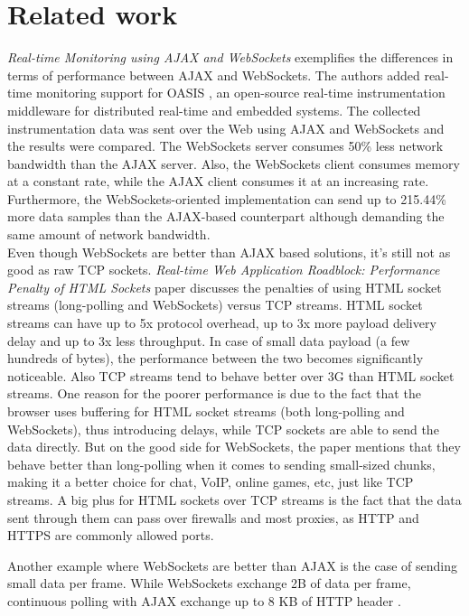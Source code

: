 \documentclass[conference]{IEEEtran}
\begin{document}
\section{Related work}
\textit{Real-time Monitoring using AJAX and WebSockets} \cite{RT-Monitoring}
exemplifies the differences in terms of performance between AJAX and WebSockets.
The authors added real-time monitoring support for OASIS \cite{OASIS},
an open-source real-time instrumentation middleware for distributed real-time
and embedded systems. The collected instrumentation data was sent over the Web
using AJAX and WebSockets and the results were compared. The WebSockets server
consumes 50\% less network bandwidth than the AJAX server. Also, the WebSockets
client consumes memory at a constant rate, while the AJAX client consumes it
at an increasing rate. Furthermore, the WebSockets-oriented implementation can
send up to 215.44\% more data samples than the AJAX-based counterpart although
demanding the same amount of network bandwidth.
\\
\indent
Even though WebSockets are better than AJAX based solutions, it's still not as
good as raw TCP sockets. \textit{Real-time Web Application Roadblock:
Performance Penalty of HTML Sockets} paper \cite{Performance-Penalty} discusses
the penalties of using HTML socket streams (long-polling and WebSockets)
versus TCP streams. HTML socket streams can have up to 5x protocol overhead, up to
3x more payload delivery delay and up to 3x less throughput. In case of small
data payload (a few hundreds of bytes), the performance between the two becomes
significantly noticeable. Also TCP streams tend to behave better over 3G than
HTML socket streams.
One reason for the poorer performance is due to the fact that the browser uses
buffering for HTML socket streams (both long-polling and WebSockets), thus 
introducing delays, while TCP sockets are able to send the data directly.
But on the good side for
WebSockets, the paper mentions that they behave better than long-polling when
it comes to sending small-sized chunks, making it a better choice for chat,
VoIP, online games, etc, just like TCP streams. A big plus for HTML sockets
over TCP streams is the fact that the data sent through them can pass over
firewalls and most proxies, as HTTP and HTTPS are commonly allowed ports.

Another example where WebSockets are better than AJAX is the case of sending
small data per frame. While WebSockets exchange 2B of data per frame, continuous
polling with AJAX exchange up to 8 KB of HTTP header \cite{2009:Misc}.
\end{document}
